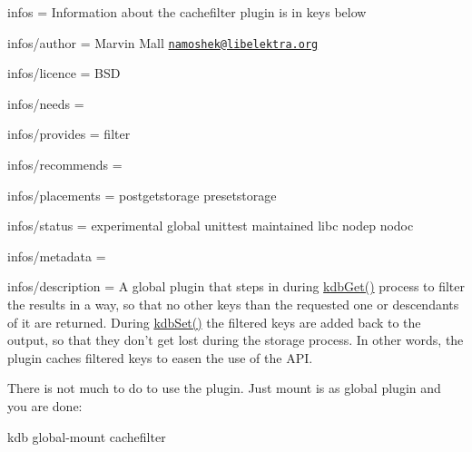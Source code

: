 
\begin{DoxyItemize}
\item infos = Information about the cachefilter plugin is in keys below
\item infos/author = Marvin Mall \href{mailto:namoshek@libelektra.org}{\tt namoshek@libelektra.\+org}
\item infos/licence = B\+S\+D
\item infos/needs =
\item infos/provides = filter
\item infos/recommends =
\item infos/placements = postgetstorage presetstorage
\item infos/status = experimental global unittest maintained libc nodep nodoc
\item infos/metadata =
\item infos/description = A global plugin that steps in during \hyperlink{group__kdb_ga28e385fd9cb7ccfe0b2f1ed2f62453a1}{kdb\+Get()} process to filter the results in a way, so that no other keys than the requested one or descendants of it are returned. During \hyperlink{group__kdb_ga11436b058408f83d303ca5e996832bcf}{kdb\+Set()} the filtered keys are added back to the output, so that they don't get lost during the storage process. In other words, the plugin caches filtered keys to easen the use of the A\+P\+I.
\end{DoxyItemize}

There is not much to do to use the plugin. Just mount is as global plugin and you are done\+: \begin{DoxyVerb}kdb global-mount cachefilter\end{DoxyVerb}
 